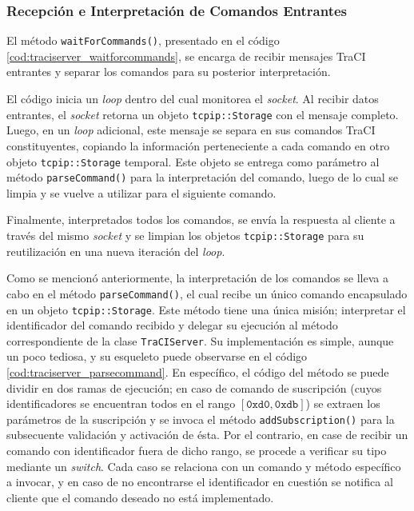 \subsubsection{Recepción e Interpretación de Comandos Entrantes}

El método \texttt{waitForCommands()}, presentado en el código \ref{cod:traciserver_waitforcommands}, se encarga de recibir mensajes TraCI entrantes y separar los comandos para su posterior interpretación.

El código inicia un \emph{loop} dentro del cual monitorea el \emph{socket}. Al recibir datos entrantes, el \emph{socket} retorna un objeto \texttt{tcpip::Storage} con el mensaje completo. Luego, en un \emph{loop} adicional, este mensaje se separa en sus comandos TraCI constituyentes, copiando la información perteneciente a cada comando en otro objeto \texttt{tcpip::Storage} temporal. Este objeto se entrega como parámetro al método \texttt{parseCommand()} para la interpretación del comando, luego de lo cual se limpia y se vuelve a utilizar para el siguiente comando.

Finalmente, interpretados todos los comandos, se envía la respuesta al cliente a través del mismo \emph{socket} y se limpian los objetos \texttt{tcpip::Storage} para su reutilización en una nueva iteración del \emph{loop}.



Como se mencionó anteriormente, la interpretación de los comandos se lleva a cabo en el método \texttt{parseCommand()}, el cual recibe un único comando encapsulado en un objeto \texttt{tcpip::Storage}. Este método tiene una única misión; interpretar el identificador del comando recibido y delegar su ejecución al método correspondiente de la clase \texttt{TraCIServer}. Su implementación es simple, aunque un poco tediosa, y su esqueleto puede observarse en el código \ref{cod:traciserver_parsecommand}. En específico, el código del método se puede dividir en dos ramas de ejecución; en caso de comando de suscripción (cuyos identificadores se encuentran todos en el rango $[\texttt{0xd0}, \texttt{0xdb}]$) se extraen los parámetros de la suscripción y se invoca el método \texttt{addSubscription()} para la subsecuente validación y activación de ésta. Por el contrario, en case de recibir un comando con identificador fuera de dicho rango, se procede a verificar su tipo mediante un \emph{switch}. Cada caso se relaciona con un comando y método específico a invocar, y en caso de no encontrarse el identificador en cuestión se notifica al cliente que el comando deseado no está implementado.

